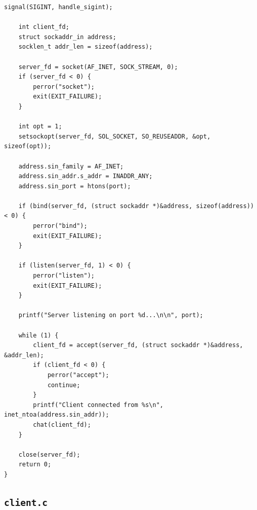 \documentclass[12pt,a4paper]{article}
\begin{document}
\begin{lstlisting}[caption={\texttt{server.c} --- serveur de chat semi-duplex}]
    signal(SIGINT, handle_sigint);

    int client_fd;
    struct sockaddr_in address;
    socklen_t addr_len = sizeof(address);

    server_fd = socket(AF_INET, SOCK_STREAM, 0);
    if (server_fd < 0) {
        perror("socket");
        exit(EXIT_FAILURE);
    }

    int opt = 1;
    setsockopt(server_fd, SOL_SOCKET, SO_REUSEADDR, &opt, sizeof(opt));

    address.sin_family = AF_INET;
    address.sin_addr.s_addr = INADDR_ANY;
    address.sin_port = htons(port);

    if (bind(server_fd, (struct sockaddr *)&address, sizeof(address)) < 0) {
        perror("bind");
        exit(EXIT_FAILURE);
    }

    if (listen(server_fd, 1) < 0) {
        perror("listen");
        exit(EXIT_FAILURE);
    }

    printf("Server listening on port %d...\n\n", port);

    while (1) {
        client_fd = accept(server_fd, (struct sockaddr *)&address, &addr_len);
        if (client_fd < 0) {
            perror("accept");
            continue;
        }
        printf("Client connected from %s\n", inet_ntoa(address.sin_addr));
        chat(client_fd);
    }

    close(server_fd);
    return 0;
}
\end{lstlisting}

\subsection{\texttt{client.c}}
\end{document}

